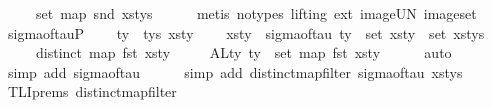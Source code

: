 \begin{isabellebody}
\ \ \ \ \ set\ {\isacharparenleft}{\kern0pt}map\ snd\ xs{\isacharunderscore}{\kern0pt}tys{\isacharparenright}{\kern0pt}{\isachardoublequoteclose}\isanewline
\ \ \ \ \isamarkupfalse%
\ {\isacharparenleft}{\kern0pt}metis\ {\isacharparenleft}{\kern0pt}no{\isacharunderscore}{\kern0pt}types{\isacharcomma}{\kern0pt}\ lifting{\isacharparenright}{\kern0pt}\ ext\ image{\isacharunderscore}{\kern0pt}UN\ image{\isacharunderscore}{\kern0pt}set{\isacharparenright}{\kern0pt}\isanewline
\isanewline
\isanewline
\ \ \isamarkupfalse%
\ sigma{\isacharunderscore}{\kern0pt}of{\isacharunderscore}{\kern0pt}tau{\isacharunderscore}{\kern0pt}P{}{\isacharcolon}{\kern0pt}\isanewline
\ \ \ \ {\isachardoublequoteopen}{\isasymforall}ty\ {\isasymin}{\isacharhash}{\kern0pt}\ tys{\isachardot}{\kern0pt}\ {\isasymforall}xs{\isacharunderscore}{\kern0pt}ty{\isachardot}{\kern0pt}\isanewline
\ \ \ \ {\isacharparenleft}{\kern0pt}xs{\isacharunderscore}{\kern0pt}ty\ {\isacharequal}{\kern0pt}\ sigma{\isacharunderscore}{\kern0pt}of{\isacharunderscore}{\kern0pt}tau\ ty\ {\isacharminus}{\kern0pt}{\isacharminus}{\kern0pt}{\isachargreater}{\kern0pt}\ {\isacharparenleft}{\kern0pt}set\ xs{\isacharunderscore}{\kern0pt}ty\ {\isasymsubseteq}\ set\ xs{\isacharunderscore}{\kern0pt}tys\isanewline
\ \ \ \ {\isasymand}\ distinct\ {\isacharparenleft}{\kern0pt}map\ fst\ xs{\isacharunderscore}{\kern0pt}ty{\isacharparenright}{\kern0pt}\isanewline
\ \ \ \ {\isasymand}\ ALty\ ty\ {\isacharequal}{\kern0pt}\ set\ {\isacharparenleft}{\kern0pt}map\ fst\ xs{\isacharunderscore}{\kern0pt}ty{\isacharparenright}{\kern0pt}{\isacharparenright}{\kern0pt}{\isacharparenright}{\kern0pt}{\isachardoublequoteclose}\isanewline
\ \ \ \ \isamarkupfalse%
\ auto\isanewline
\ \ \ \ \isamarkupfalse%
\ {\isacharparenleft}{\kern0pt}simp\ add{\isacharcolon}{\kern0pt}\ sigma{\isacharunderscore}{\kern0pt}of{\isacharunderscore}{\kern0pt}tau{\isacharparenright}{\kern0pt}\isanewline
\ \ \ \ \isamarkupfalse%
\ {\isacharparenleft}{\kern0pt}simp\ add{\isacharcolon}{\kern0pt}\ distinct{\isacharunderscore}{\kern0pt}map{\isacharunderscore}{\kern0pt}filter\ sigma{\isacharunderscore}{\kern0pt}of{\isacharunderscore}{\kern0pt}tau\ xs{\isacharunderscore}{\kern0pt}tys{\isacharparenright}{\kern0pt}\isanewline
\ \ \ \ \isamarkupfalse%
\ TLI{\isachardot}{\kern0pt}prems{\isacharparenleft}{\kern0pt}{}{\isacharparenright}{\kern0pt}\ distinct{\isacharunderscore}{\kern0pt}map{\isacharunderscore}{\kern0pt}filter\ \isamarkupfalse%

\end{isabellebody}
